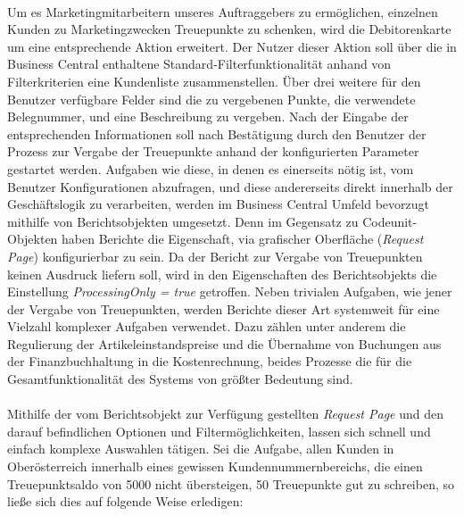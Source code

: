 \paragraph{}
Um es Marketingmitarbeitern unseres Auftraggebers zu ermöglichen, einzelnen Kunden zu Marketingzwecken Treuepunkte zu schenken, wird die Debitorenkarte um eine entsprechende Aktion erweitert. Der Nutzer dieser Aktion soll über die in Business Central enthaltene Standard-Filterfunktionalität anhand von Filterkriterien eine Kundenliste zusammenstellen. Über drei weitere für den Benutzer verfügbare Felder sind die zu vergebenen Punkte, die verwendete Belegnummer, und eine Beschreibung zu vergeben. Nach der Eingabe der entsprechenden Informationen soll nach Bestätigung durch den Benutzer der Prozess zur Vergabe der Treuepunkte anhand der konfigurierten Parameter gestartet werden. Aufgaben wie diese, in denen es einerseits nötig ist, vom Benutzer Konfigurationen abzufragen, und diese andererseits direkt innerhalb der Geschäftslogik zu verarbeiten, werden im Business Central Umfeld bevorzugt mithilfe von Berichtsobjekten umgesetzt. Denn im Gegensatz zu Codeunit-Objekten haben Berichte die Eigenschaft, via grafischer Oberfläche (\textit{Request Page}) konfigurierbar zu sein. Da der Bericht zur Vergabe von Treuepunkten keinen Ausdruck liefern soll, wird in den Eigenschaften des Berichtsobjekts die Einstellung \textit{ProcessingOnly = true} getroffen. Neben trivialen Aufgaben, wie jener der Vergabe von Treuepunkten, werden Berichte dieser Art systemweit für eine Vielzahl komplexer Aufgaben verwendet. Dazu zählen unter anderem die Regulierung der Artikeleinstandspreise und die Übernahme von Buchungen aus der Finanzbuchhaltung in die Kostenrechnung, beides Prozesse die für die Gesamtfunktionalität des Systems von größter Bedeutung sind.

\paragraph{}
Mithilfe der vom Berichtsobjekt zur Verfügung gestellten \textit{Request Page} und den darauf befindlichen Optionen und Filtermöglichkeiten, lassen sich schnell und einfach komplexe Auswahlen tätigen. Sei die Aufgabe, allen Kunden in Oberösterreich innerhalb eines gewissen Kundennummernbereichs, die einen Treuepunktsaldo von 5000 nicht übersteigen, 50 Treuepunkte gut zu schreiben, so ließe sich dies auf folgende Weise erledigen:


